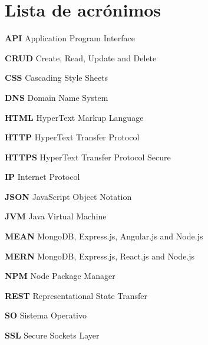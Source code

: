 \section*{Lista de acrónimos}

\noindent \textbf{API} Application Program Interface \newline \smallskip 

\noindent \textbf{CRUD} Create, Read, Update and Delete \newline \smallskip

\noindent \textbf{CSS} Cascading Style Sheets \newline \smallskip

\noindent \textbf{DNS} Domain Name System \newline \smallskip

\noindent \textbf{HTML} HyperText Markup Language \newline \smallskip

\noindent \textbf{HTTP} HyperText Transfer Protocol \newline \smallskip

\noindent \textbf{HTTPS} HyperText Transfer Protocol Secure \newline \smallskip

\noindent \textbf{IP} Internet Protocol \newline \smallskip

\noindent \textbf{JSON} JavaScript Object Notation \newline \smallskip

\noindent \textbf{JVM} Java Virtual Machine \newline \smallskip

\noindent \textbf{MEAN} MongoDB, Express.js, Angular.js and Node.js \newline \smallskip 

\noindent \textbf{MERN} MongoDB, Express.js, React.js and Node.js \newline \smallskip

\noindent \textbf{NPM} Node Package Manager \newline \smallskip

\noindent \textbf{REST} Representational State Transfer \newline \smallskip

\noindent \textbf{SO} Sistema Operativo \newline \smallskip

\noindent \textbf{SSL} Secure Sockets Layer \newline \smallskip


